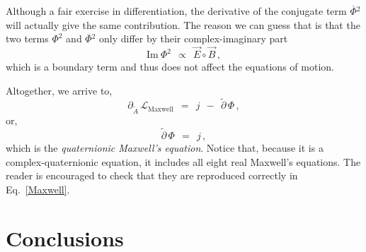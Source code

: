 \documentclass[epsfig,12pt]{article}
\newcommand{\cell}{{\mathcal L}}
\newcommand{\p}{\partial}
\newcommand{\wt}{\widetilde}
\newcommand{\ov}{\overline}
\begin{document}
	Although a fair exercise in differentiation, the derivative of the conjugate term $ \ov\Phi{}^2 $
	will actually give the same contribution.
	The reason we can guess that is that the two terms $ \Phi^2 $ and $ \ov\Phi{}^2 $
	only differ by their complex-imaginary part
\begin{equation}
	\text{Im}~\Phi^2	~~\propto~~	\vec E \circ \vec B\,,
\end{equation}
	which is a boundary term and thus does not affect the equations of motion.

	Altogether, we arrive to,
\begin{equation}
	\p_{\wt A}\, \cell_\text{Maxwell}	~~=~~	j  ~~-~~  \wt\p\,\Phi\,,
\end{equation}
	or,
\begin{equation}
\label{Maxwell}
	\wt\p\,\Phi	~~=~~	j\,,
\end{equation}
	which is the \emph{quaternionic Maxwell's equation}.
	Notice that, because it is a complex-quaternionic equation, 
	it includes all eight real Maxwell's equations.
	The reader is encouraged to check that they are reproduced correctly in Eq.~\eqref{Maxwell}.



\pagebreak
\section{Conclusions}




\end{document}
